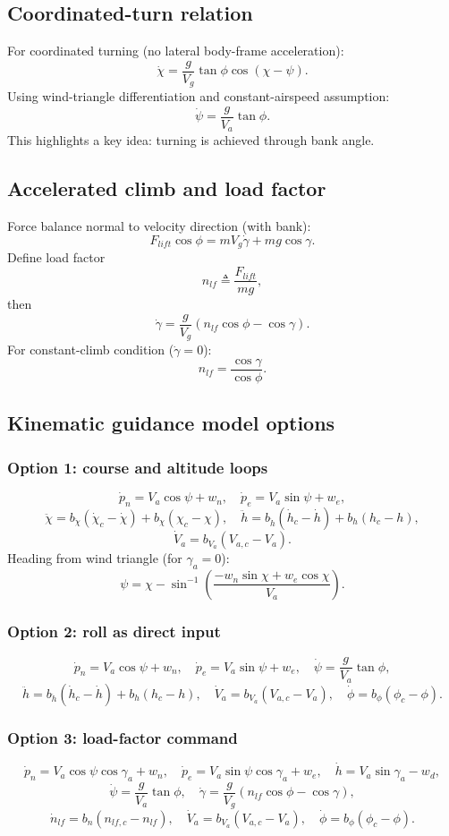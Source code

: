 \documentclass[11pt,a4paper]{article}
\begin{document}
\subsection{Coordinated-turn relation}
For coordinated turning (no lateral body-frame acceleration):
\[
\dot\chi=\frac{g}{V_g}\tan\phi\cos(\chi-\psi).
\]
Using wind-triangle differentiation and constant-airspeed assumption:
\[
\dot\psi=\frac{g}{V_a}\tan\phi.
\]
This highlights a key idea: turning is achieved through bank angle.

\subsection{Accelerated climb and load factor}
Force balance normal to velocity direction (with bank):
\[
F_{lift}\cos\phi = mV_g\dot\gamma + mg\cos\gamma.
\]
Define load factor
\[
n_{lf}\triangleq \frac{F_{lift}}{mg},
\]
then
\[
\dot\gamma=\frac{g}{V_g}(n_{lf}\cos\phi-\cos\gamma).
\]
For constant-climb condition ($\dot\gamma=0$):
\[
n_{lf}=\frac{\cos\gamma}{\cos\phi}.
\]

\subsection{Kinematic guidance model options}
\subsubsection*{Option 1: course and altitude loops}
\[
\dot p_n=V_a\cos\psi+w_n,\quad
\dot p_e=V_a\sin\psi+w_e,
\]
\[
\ddot\chi=b_{\dot\chi}(\dot\chi_c-\dot\chi)+b_{\chi}(\chi_c-\chi),\quad
\ddot h=b_{\dot h}(\dot h_c-\dot h)+b_h(h_c-h),
\]
\[
\dot V_a=b_{V_a}(V_{a,c}-V_a).
\]
Heading from wind triangle (for $\gamma_a=0$):
\[
\psi=\chi-\sin^{-1}\!\left(\frac{-w_n\sin\chi+w_e\cos\chi}{V_a}\right).
\]

\subsubsection*{Option 2: roll as direct input}
\[
\dot p_n=V_a\cos\psi+w_n,\quad
\dot p_e=V_a\sin\psi+w_e,\quad
\dot\psi=\frac{g}{V_a}\tan\phi,
\]
\[
\ddot h=b_{\dot h}(\dot h_c-\dot h)+b_h(h_c-h),\quad
\dot V_a=b_{V_a}(V_{a,c}-V_a),\quad
\dot\phi=b_{\phi}(\phi_c-\phi).
\]

\subsubsection*{Option 3: load-factor command}
\[
\dot p_n=V_a\cos\psi\cos\gamma_a+w_n,\quad
\dot p_e=V_a\sin\psi\cos\gamma_a+w_e,\quad
\dot h=V_a\sin\gamma_a-w_d,
\]
\[
\dot\psi=\frac{g}{V_a}\tan\phi,\quad
\dot\gamma=\frac{g}{V_g}(n_{lf}\cos\phi-\cos\gamma),
\]
\[
\dot n_{lf}=b_n(n_{lf,c}-n_{lf}),\quad
\dot V_a=b_{V_a}(V_{a,c}-V_a),\quad
\dot\phi=b_\phi(\phi_c-\phi).
\]
\end{document}
